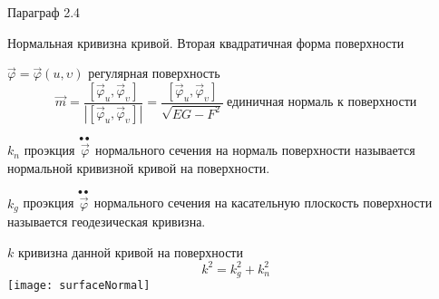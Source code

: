 \begin{title}[\Large]
  Параграф 2.4
\end{title}

\begin{title}[\Large]
  Нормальная кривизна кривой. Вторая квадратичная форма поверхности
\end{title}

\begin{define}
  $\vec \varphi = \vec \varphi(u, \upsilon)$ регулярная поверхность
  $$
  \vec m = \frac{[\vec \varphi_u, \vec \varphi_{\upsilon}]}{|[\vec \varphi_u,
  \vec \varphi_{\upsilon}]|} = \frac{[\vec \varphi_u, \vec \varphi_{\upsilon}]}
  {\sqrt{EG - F^2}} ~ \text{единичная нормаль к поверхности}
  $$
\end{define}

\begin{define}
  $k_n$ проэкция $\stackrel{\bullet \bullet}{\vec \varphi}$ нормального сечения
  на нормаль поверхности называется нормальной кривизной кривой на поверхности.

  $k_g$ проэкция $\stackrel{\bullet \bullet}{\vec \varphi}$ нормального сечения
  на касательную плоскость поверхности называется геодезическая кривизна.

  $k$ кривизна данной кривой на поверхности
  $$
  k^2 = k_g^2 + k_n^2
  $$
  \texttt{[image: surfaceNormal]}
\end{define}

